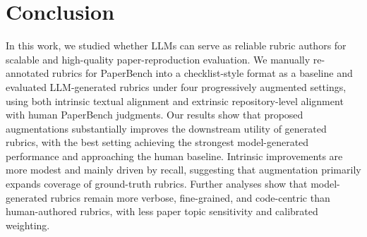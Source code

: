 \documentclass[11pt]{article}
\begin{document}


\section{Conclusion}

In this work, we studied whether LLMs can serve as reliable rubric authors for scalable and high-quality paper-reproduction evaluation. We manually re-annotated rubrics for PaperBench into a checklist-style format as a baseline and evaluated LLM-generated rubrics under four progressively augmented settings, using both intrinsic textual alignment and extrinsic repository-level alignment with human PaperBench judgments. Our results show that proposed augmentations substantially improves the downstream utility of generated rubrics, with the best setting achieving the strongest model-generated performance and approaching the human baseline. Intrinsic improvements are more modest and mainly driven by recall, suggesting that augmentation primarily expands coverage of ground-truth rubrics. Further analyses show that model-generated rubrics remain more verbose, fine-grained, and code-centric than human-authored rubrics, with less paper topic sensitivity and calibrated weighting.
\end{document}
